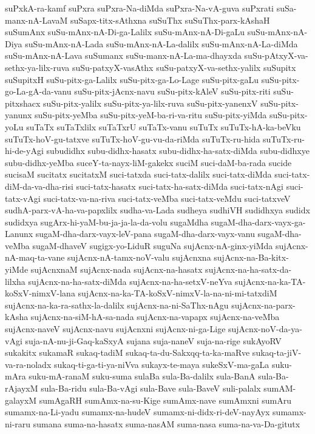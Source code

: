 {suPxkA-ra-kamf
suPxra
suPxra-Na-diMda
suPxra-Na-vA-guva
suPxrati
suSa-manx-nA-LavaM
suSapx-titx-sAthxna
suSuThx
suSuThx-parx-kAshaH
suSumAnx
suSu-mAnx-nA-Di-ga-Lalilx
suSu-mAnx-nA-Di-gaLu
suSu-mAnx-nA-Diya
suSu-mAnx-nA-Lada
suSu-mAnx-nA-La-dalilx
suSu-mAnx-nA-La-diMda
suSu-mAnx-nA-Lava
suSumanx
suSu-manx-nA-La-ma-dhayxda
suSu-pAtxyX-va-sethx-ya-lilx-ruva
suSu-patxyX-vasAthx
suSu-patxyX-va-sethx-yalilx
suSupitx
suSupitxH
suSu-pitx-ga-Lalilx
suSu-pitx-ga-Lo-Lage
suSu-pitx-gaLu
suSu-pitx-go-La-gA-da-vanu
suSu-pitx-jAcnx-navu
suSu-pitx-kAleV
suSu-pitx-riti
suSu-pitxshacx
suSu-pitx-yalilx
suSu-pitx-ya-lilx-ruva
suSu-pitx-yanenxV
suSu-pitx-yanunx
suSu-pitx-yeMba
suSu-pitx-yeM-ba-ri-va-ritu
suSu-pitx-yiMda
suSu-pitx-yoLu
suTaTx
suTaTxlilx
suTaTxrU
suTaTx-vanu
suTuTx
suTuTx-hA-ka-beVku
suTuTx-hoV-gu-tatxve
suTuTx-hoV-gu-vu-da-riMda
suTuTx-ru-hida
suTuTx-ru-hi-de-yAgi
subudidhx
subu-didhx-hasatx
subu-didhx-ha-satx-diMda
subu-didhxye
subu-didhx-yeMba
suceY-ta-nayx-liM-gakekx
suciM
suci-daM-ba-rada
sucide
sucisaM
sucitatx
sucitatxM
suci-tatxda
suci-tatx-dalilx
suci-tatx-diMda
suci-tatx-diM-da-va-dha-risi
suci-tatx-hasatx
suci-tatx-ha-satx-diMda
suci-tatx-nAgi
suci-tatx-vAgi
suci-tatx-va-na-riva
suci-tatx-veMba
suci-tatx-veMdu
suci-tatxveV
sudhA-parx-vA-ha-va-papxlilx
sudha-va-Lada
sudheya
sudhiVH
sudidhxya
sudidx
sudidxya
sugArx-hi-yaM-bu-ja-ja-la-da-volu
sugaMdha
sugaM-dha-darx-vayx-ga-Lanunx
sugaM-dha-darx-vayx-leV-pana
sugaM-dha-darx-vayx-vanu
sugaM-dha-veMba
sugaM-dhaveV
sugigx-yo-LiduR
suguNa
sujAcnx-nA-ginx-yiMda
sujAcnx-nA-maq-ta-vane
sujAcnx-nA-tamx-noV-valu
sujAcnxna
sujAcnx-na-Ba-kitx-yiMde
sujAcnxnaM
sujAcnx-nada
sujAcnx-na-hasatx
sujAcnx-na-ha-satx-da-lilxha
sujAcnx-na-ha-satx-diMda
sujAcnx-na-ha-setxV-neYva
sujAcnx-na-ka-TA-koSxV-nimxV-lana
sujAcnx-na-ka-TA-koSxV-nimxV-la-na-ni-mi-tatxdiM
sujAcnx-na-ka-ra-sathx-la-dalilx
sujAcnx-na-ni-SaThx-nAgu
sujAcnx-na-parx-kAsha
sujAcnx-na-siM-hA-sa-nada
sujAcnx-na-vapapx
sujAcnx-na-veMba
sujAcnx-naveV
sujAcnx-navu
sujAcnxni
sujAcnx-ni-ga-Lige
sujAcnx-noV-da-ya-vAgi
suja-nA-nu-ji-Gaq-kaSxyA
sujana
suja-naneV
suja-na-rige
sukAyoRV
sukakitx
sukamaR
sukaq-tadiM
sukaq-ta-du-Sakxqq-ta-ka-maRve
sukaq-ta-jiV-va-ra-noladx
sukaq-ti-ga-ti-ya-niVva
sukayx-te-maya
sukeSxV-ma-gaLa
suku-mAra
suku-mA-ranaM
suku-suma
sulaBa
sula-Ba-dalilx
sula-BanA
sula-Ba-rAjayxM
sula-Ba-ridu
sula-Ba-vAgi
sula-Bave
sula-BaveV
suli-palalx
sumAM-galayxM
sumAgaRH
sumAmx-na-su-Kige
sumAmx-nave
sumAmxni
sumAru
sumamx-na-Li-yadu
sumamx-na-hudeV
sumamx-ni-didx-ri-deV-nayAyx
sumamx-ni-raru
sumana
suma-na-hasatx
suma-nasAM
suma-nasa
suma-na-va-Da-gitutx
}
